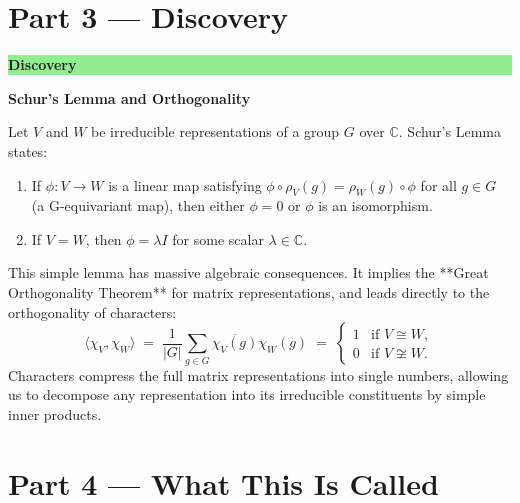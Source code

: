 \documentclass[12pt, a4paper]{article}
\newenvironment{discoverybox}
  {\par\medskip\fillcolorbox{LightGreen}{DiscoveryColor}{Discovery}}
  {\par\medskip}
\newcommand{\fillcolorbox}[3]{%
  \noindent
  \filldrawbox{#1}{#2}{\textbf{\sffamily\color{white}#3}}\par\nobreak\vspace{4pt}
}
\newcommand{\filldrawbox}[3]{%
  \colorbox{#1}{\parbox{\dimexpr\linewidth-2\fboxsep\relax}{%
    \vspace{4pt}\noindent\hspace{4pt}#3\vspace{4pt}%
  }}%
}
\begin{document}
\newpage

\section{Part 3 --- Discovery}

\begin{discoverybox}
\textbf{Schur's Lemma and Orthogonality}

Let $V$ and $W$ be irreducible representations of a group $G$ over $\mathbb{C}$. Schur's Lemma states:
\begin{enumerate}
  \item If $\phi: V \to W$ is a linear map satisfying $\phi \circ \rho_V(g) = \rho_W(g) \circ \phi$ for all $g \in G$ (a G-equivariant map), then either $\phi = 0$ or $\phi$ is an isomorphism.
  \item If $V = W$, then $\phi = \lambda I$ for some scalar $\lambda \in \mathbb{C}$.
\end{enumerate}

This simple lemma has massive algebraic consequences. It implies the **Great Orthogonality Theorem** for matrix representations, and leads directly to the orthogonality of characters:
\[
  \langle \chi_V, \chi_W \rangle \;=\; \frac{1}{|G|} \sum_{g \in G} \overline{\chi_V(g)}\chi_W(g) \;=\; \begin{cases}
    1 & \text{if } V \cong W, \\
    0 & \text{if } V \not\cong W.
  \end{cases}
\]
Characters compress the full matrix representations into single numbers, allowing us to decompose any representation into its irreducible constituents by simple inner products.
\end{discoverybox}

\newpage

\section{Part 4 --- What This Is Called}
\end{document}
